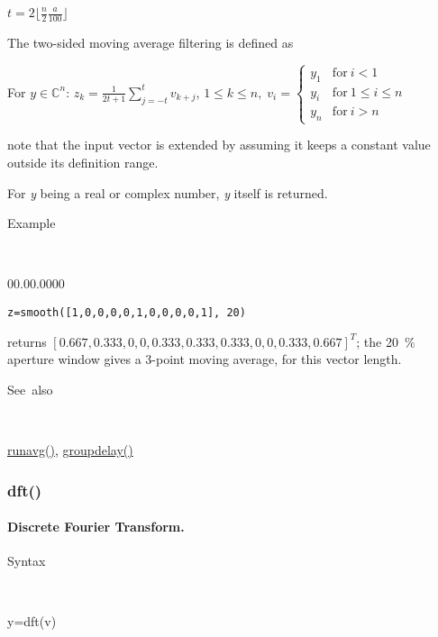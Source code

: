 \medskip{}
$t=$${\displaystyle 2 \lfloor \frac{n}{2} \frac{a}{100} \rfloor }$
\medskip{}

The two-sided moving average filtering is defined as

\medskip{}
For $y\in$$\mathbb{C}^{n}$: $z_{k}=$${\displaystyle \frac{1}{2t+1} \sum\limits _{j=-t}^{t}v_{k+j}}$,\;
$1\leq k\leq n,\; v_{i}=\left\{ \begin{array}{ll}
y_{1} & \mathrm{for}\: i < 1\\
y_{i} & \mathrm{for}\: 1 \leq i \leq n\\
y_{n} & \mathrm{for}\: i > n\end{array}\right.$
\medskip{}

note that the input vector is extended by assuming it keeps a constant value outside its definition range.

For \textit{y} being a real or complex number, \textit{y} itself is returned.

\medskip{}\medskip{}

\begin{description}
\item [Example]~
\end{description}
\begin{lyxlist}{00.00.0000}
\item [\texttt{z=smooth([1,0,0,0,0,1,0,0,0,0,1], 20)}]
\end{lyxlist}
returns $\left[0.667,0.333,0,0,0.333,0.333,0.333,0,0,0.333,0.667\right]^T$; the 20~\% aperture window gives a 3-point moving average, for this vector length.
\begin{description}
\item [See~also]~
\end{description}
\textcolor{blue}{\hyperlink{runavg}{runavg()}}\textcolor{black}{,}
\textcolor{blue}{\hyperlink{groupdelay}{groupdelay()}}


\newpage
{}


\subsubsection*{\hypertarget{dft}{}{\Large dft()}}


\paragraph{\label{par:Discrete-Fourier-Transform}Discrete Fourier Transform.}

\begin{description}
\item [Syntax]~
\end{description}
y=dft(v)

